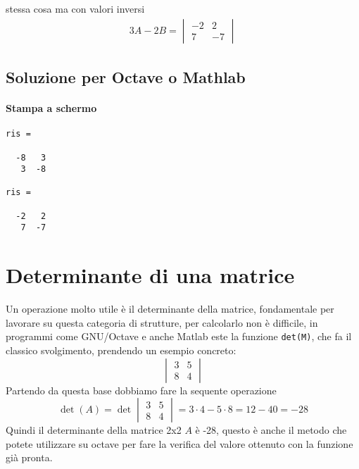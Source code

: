 \documentclass{book}
\begin{document}
stessa cosa ma con valori inversi 
\begin{eqnarray*}
  3A-2B=
  \begin{vmatrix}
    -2 & 2 \\
    7 & -7
  \end{vmatrix}
\end{eqnarray*}

\subsection{Soluzione per Octave o Mathlab}
\label{sec:solmatoctes1}

\paragraph{Stampa a schermo}
\begin{verbatim}
ris =

  -8   3
   3  -8

ris =

  -2   2
   7  -7
\end{verbatim}


\section{Determinante di una matrice}
\label{sec:mtxdet}
Un operazione molto utile è il determinante della matrice, fondamentale per
lavorare su questa categoria di strutture, per calcolarlo non è difficile, in
programmi come GNU/Octave e anche Matlab este la funzione \lstinline|det(M)|,
che fa il classico svolgimento, prendendo un esempio concreto:
\begin{equation}
  \label{eq:es2}
  \begin{vmatrix}
    3 & 5\\
    8 & 4
  \end{vmatrix}
\end{equation}
Partendo da questa base dobbiamo fare la sequente operazione
\begin{equation}
  \label{eq:es2_sv}
  \det(A) =\det \begin{vmatrix}
    3 & 5\\
    8 & 4
  \end{vmatrix}= 3\cdot 4 -5\cdot 8 = 12 - 40 = -28
\end{equation}
Quindi il determinante della matrice 2x2 $A$ è -28, questo è anche il metodo che
potete utilizzare su octave per fare la verifica del valore ottenuto con la
funzione già pronta.
\end{document}
